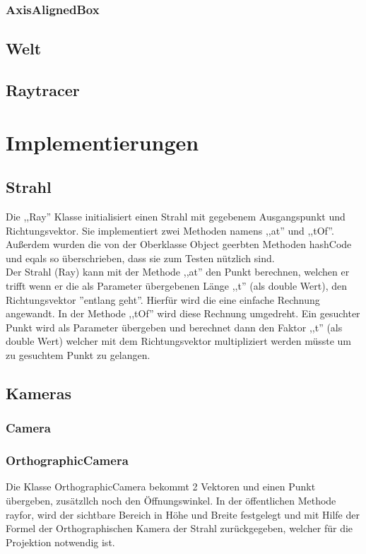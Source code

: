 \documentclass[14pt]{extarticle}
\begin{document}
\subsubsection{AxisAlignedBox}

\subsection{Welt}
\subsection{Raytracer}

\section{Implementierungen}

\subsection{Strahl}
Die ,,Ray'' Klasse initialisiert einen Strahl mit gegebenem Ausgangspunkt und Richtungsvektor. Sie implementiert zwei Methoden namens ,,at'' und ,,tOf''. Außerdem wurden die von der Oberklasse Object geerbten Methoden hashCode und eqals so überschrieben, dass sie zum Testen nützlich sind.\\
Der Strahl (Ray) kann mit der Methode ,,at'' den Punkt berechnen, welchen er trifft wenn er die als Parameter übergebenen Länge ,,t'' (als double Wert), den Richtungsvektor ''entlang geht''. Hierfür wird die eine einfache Rechnung angewandt. 
In der Methode ,,tOf'' wird diese Rechnung umgedreht. Ein gesuchter Punkt wird als Parameter übergeben und berechnet dann den Faktor ,,t'' (als double Wert) welcher mit dem Richtungsvektor multipliziert werden müsste um zu gesuchtem Punkt zu gelangen. \\
\subsection{Kameras}
\subsubsection{Camera}
\subsubsection{OrthographicCamera}
Die Klasse OrthographicCamera  bekommt 2 Vektoren und einen Punkt übergeben, zusätzllch noch den Öffnungswinkel. In der öffentlichen Methode rayfor, wird der sichtbare Bereich in Höhe und Breite festgelegt und mit Hilfe der Formel der Orthographischen Kamera der Strahl zurückgegeben, welcher für die Projektion notwendig ist.
\end{document}
